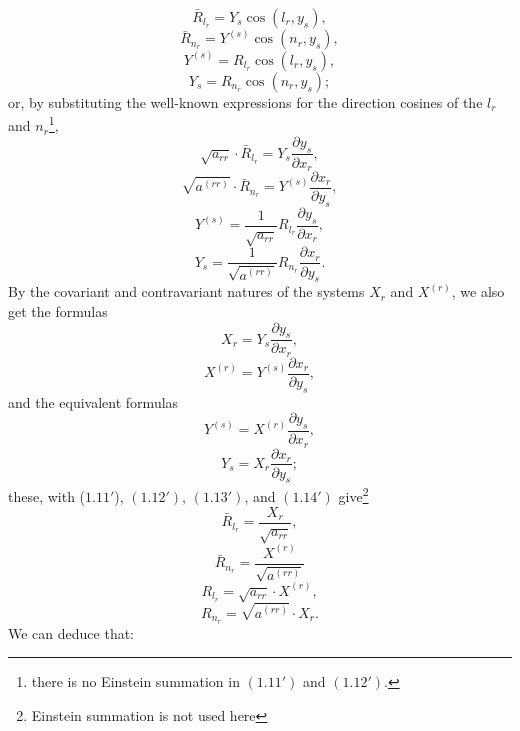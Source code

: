 \documentclass{book}
\begin{document}
\begin{equation}
\bar{R}_{l_r}=Y_s\cos(l_r,y_s),
\end{equation}
\begin{equation}
\bar{R}_{n_r}=Y^{(s)}\cos(n_r,y_s),
\end{equation}
\begin{equation}
Y^{(s)}=R_{l_r}\cos(l_r,y_s),
\end{equation}
\begin{equation}
Y_s=R_{n_r}\cos(n_r,y_s);
\end{equation}
or, by substituting the well-known expressions for the direction cosines of the $l_r$ and $n_r$\footnote{there is no Einstein summation in $(1.11')$ and $(1.12')$.},
\begin{equation*}
\tag{$1.11'$}
\sqrt{a_{rr}}\cdot\bar{R}_{l_r}=Y_{s}\frac{\partial y_s}{\partial x_r},
\end{equation*}
\begin{equation*}
\tag{$1.12'$}
\sqrt{a^{(rr)}}\cdot\bar{R}_{n_r}=Y^{(s)}\frac{\partial x_r}{\partial y_s},
\end{equation*}
\begin{equation*}
\tag{$1.13'$}
Y^{(s)}=\frac{1}{\sqrt{a_{rr}}}R_{l_r}\frac{\partial y_s}{\partial x_r},
\end{equation*}
\begin{equation*}
\tag{$1.14'$}
Y_s=\frac{1}{\sqrt{a^{(rr)}}}R_{n_r}\frac{\partial x_r}{\partial y_s}.
\end{equation*}
By the covariant and contravariant natures of the systems $X_r$ and $X^{(r)}$, we also get the formulas
$$X_r=Y_s\frac{\partial y_s}{\partial x_r},$$
$$X^{(r)}=Y^{(s)}\frac{\partial x_r}{\partial y_s},$$
and the equivalent formulas
$$Y^{(s)}=X^{(r)}\frac{\partial y_s}{\partial x_r},$$
$$Y_s=X_r\frac{\partial x_r}{\partial y_s};$$
these, with ($1.11'$), $(1.12')$, $(1.13')$, and $(1.14')$ give\footnote{Einstein summation is not used here}
\begin{equation}
\bar{R}_{l_r}=\frac{X_r}{\sqrt{a_{rr}}},
\end{equation}
\begin{equation}
\bar{R}_{n_r}=\frac{X^{(r)}}{\sqrt{a^{(rr)}}}
\end{equation}
\begin{equation}
R_{l_r}=\sqrt{a_{rr}}\cdot X^{(r)},
\end{equation}
\begin{equation}
R_{n_r}=\sqrt{a^{(rr)}}\cdot X_r.
\end{equation}
We can deduce that:
\end{document}
